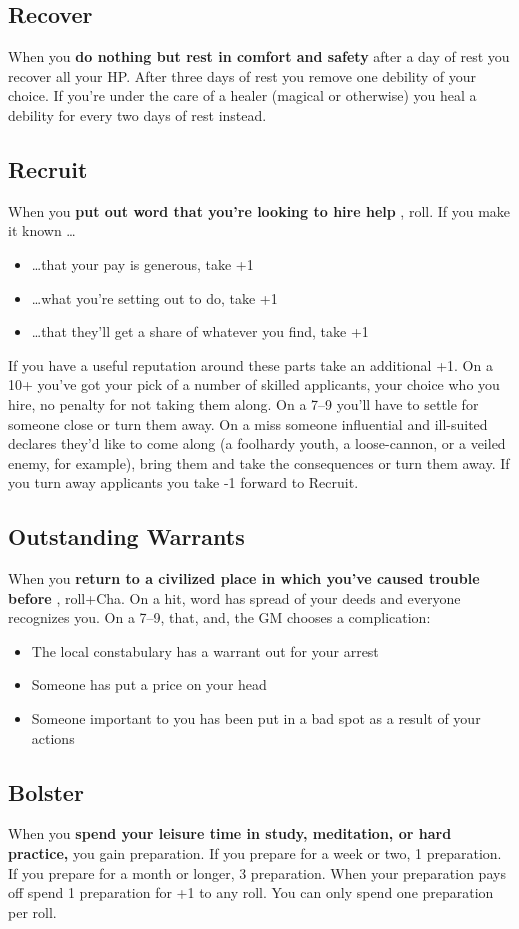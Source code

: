 \subsection{Recover}


 When you \textbf{do nothing but rest in comfort and safety}
 after a day of rest you recover all your HP\@. After three days of rest you remove one debility of your choice. If you're under the care of a healer (magical or otherwise) you heal a debility for every two days of rest instead.
\subsection{Recruit}


 When you \textbf{put out word that you're looking to hire help}
, roll. If you make it known \ldots 
\begin{itemize}
\item  \ldots that your pay is generous, take +1
\item  \ldots what you're setting out to do, take +1
\item  \ldots that they'll get a share of whatever you find, take +1

\end{itemize}


 If you have a useful reputation around these parts take an additional +1. On a 10+ you've got your pick of a number of skilled applicants, your choice who you hire, no penalty for not taking them along. On a 7--9 you'll have to settle for someone close or turn them away. On a miss someone influential and ill-suited declares they'd like to come along (a foolhardy youth, a loose-cannon, or a veiled enemy, for example), bring them and take the consequences or turn them away. If you turn away applicants you take -1 forward to Recruit.
\subsection{Outstanding Warrants}


 When you \textbf{return to a civilized place in which you've caused trouble before}
, roll+Cha. On a hit, word has spread of your deeds and everyone recognizes you. On a 7--9, that, and, the GM chooses a complication:
\begin{itemize}
\item The local constabulary has a warrant out for your arrest
\item Someone has put a price on your head
\item Someone important to you has been put in a bad spot as a result of your actions
\end{itemize}
\subsection{Bolster}


 When you \textbf{spend your leisure time in study, meditation, or hard practice,}
 you gain preparation. If you prepare for a week or two, 1 preparation. If you prepare for a month or longer, 3 preparation. When your preparation pays off spend 1 preparation for +1 to any roll. You can only spend one preparation per roll.


